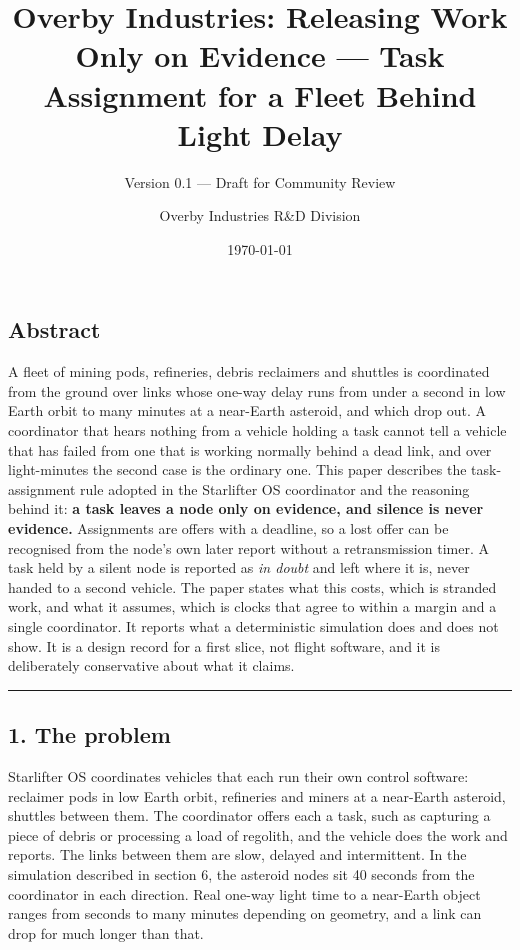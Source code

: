\documentclass[
  12pt,
  letterpaper,
]{article}
\title{Overby Industries: Releasing Work Only on Evidence --- Task
Assignment for a Fleet Behind Light Delay}
\subtitle{Version 0.1 --- Draft for Community Review}
\author{Overby Industries R\&D Division}
\date{\today}
\begin{document}
\maketitle

{
\hypersetup{linkcolor=}
\setcounter{tocdepth}{2}
\tableofcontents
}
\hypertarget{abstract}{%
\subsection{Abstract}\label{abstract}}

A fleet of mining pods, refineries, debris reclaimers and shuttles is
coordinated from the ground over links whose one-way delay runs from
under a second in low Earth orbit to many minutes at a near-Earth
asteroid, and which drop out. A coordinator that hears nothing from a
vehicle holding a task cannot tell a vehicle that has failed from one
that is working normally behind a dead link, and over light-minutes the
second case is the ordinary one. This paper describes the
task-assignment rule adopted in the Starlifter OS coordinator and the
reasoning behind it: \textbf{a task leaves a node only on evidence, and
silence is never evidence.} Assignments are offers with a deadline, so a
lost offer can be recognised from the node's own later report without a
retransmission timer. A task held by a silent node is reported as
\emph{in doubt} and left where it is, never handed to a second vehicle.
The paper states what this costs, which is stranded work, and what it
assumes, which is clocks that agree to within a margin and a single
coordinator. It reports what a deterministic simulation does and does
not show. It is a design record for a first slice, not flight software,
and it is deliberately conservative about what it claims.

\begin{center}\rule{0.5\linewidth}{0.5pt}\end{center}

\hypertarget{the-problem}{%
\subsection{1. The problem}\label{the-problem}}

Starlifter OS coordinates vehicles that each run their own control
software: reclaimer pods in low Earth orbit, refineries and miners at a
near-Earth asteroid, shuttles between them. The coordinator offers each
a task, such as capturing a piece of debris or processing a load of
regolith, and the vehicle does the work and reports. The links between
them are slow, delayed and intermittent. In the simulation described in
section 6, the asteroid nodes sit 40 seconds from the coordinator in
each direction. Real one-way light time to a near-Earth object ranges
from seconds to many minutes depending on geometry, and a link can drop
for much longer than that.
\end{document}
